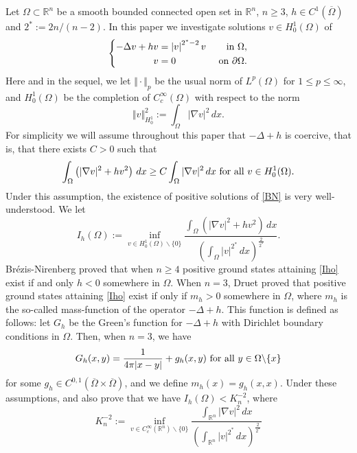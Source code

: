 \documentclass[10pt]{amsart}
\numberwithin{equation}{section}
\newcommand{\Om}{\Omega}
\def \rr {\mathbb{R}}
\def \bb{\hbox}
\def \vv {\mathbb{\Vert}}
\theoremstyle{plain}
\theoremstyle{remark}
\begin{document}
Let $\Om\subset \rr^n$ be a smooth bounded connected open set in $\rr^n$, $n\geq 3$, $h \in C^1(\overline{\Om})$ and  $2^*:=2n/(n-2)$. In this paper we investigate solutions $v \in H^1_0(\Om)$ of 
		\begin{equation}\label{BN}
			\left\{\begin{aligned}
						-\Delta v+h v& =\left|v\right|^{2^*-2}v &\hbox{ in } \Omega, \\
			v& = 0  &\hbox{ on } \partial \Omega.
		\end{aligned}\right.
	\end{equation}
	Here and in the sequel, we let $\vv \cdot \vv_p$ be the usual norm of $L^p(\Om)$ for $1\leq p\leq \infty$, and $H_0^1(\Om)$ be the completion of $C_c^{\infty}(\Om)$ with respect to the norm
	 $$\vv v \vv_{H_0^1}^2:=\int_{\Om}|\nabla v|^2\, dx.$$
For simplicity we will assume throughout this paper that $- \Delta + h$ is coercive, that is, that there exists $C>0$ such that 
		 \begin{equation*}
		 	\int_{\Om} \left(|\nabla v|^2+h v^2 \right) \, dx \geq C \int_{\Om} |\nabla v|^2\, dx \bb{ for all } v\in H_0^1(\Om).
		 \end{equation*}
Under this assumption, the existence of positive solutions of \eqref{BN} is very well-understood. We let 
	\begin{equation}\label{Iho}
		I_{h}(\Om):=	\inf_{v\in H_0^1(\Om) \backslash \{0 \} }\frac{\int_\Om \left( |\nabla v|^2+h v^2\right)\, dx}{\left( \int_\Om |v|^{2^*}\, dx\right) ^{\frac{2}{2^*}}}.
	\end{equation}
Br\'ezis-Nirenberg \cite{BN} proved that when $n \ge 4$ positive ground states attaining \eqref{Iho} exist if and only $h<0$ somewhere in $\Om$. When $n=3$, Druet  \cite{Druetdim3} proved that positive ground states attaining \eqref{Iho} exist if only if $m_h >0$ somewhere in $\Om$, where $m_h$ is the so-called mass-function of the operator $-\Delta +h$. This function is defined as follows: let $G_h$ be the Green's function for $-\Delta +h$ with Dirichlet boundary conditions in $\Om$. Then, when $n=3$, we have
	\begin{equation*}
		G_{h}(x,y)=\frac{1}{4 \pi |x-y|}+g_{h}(x,y) \bb{ for all } y\in \Om\backslash \{x\}
	\end{equation*}
for some $g_h \in C^{0,1}(\overline{\Om}\times \overline{\Om})$, and we define $m_h(x) = g_{h}(x,x)$.
Under these assumptions, \cite{BN} and \cite{Druetdim3} also prove that we have $I_{h}(\Om) < K_n^{-2}$, where 
	\begin{equation}\label{defkn}
		K_n^{-2}:=\inf_{v\in C_c^{\infty}(\rr^n)\backslash\{0\}} \frac{\int_{\rr^n}|\nabla v|^2\, dx}{\left( \int_{\rr^n}| v|^{2^*}\, dx\right)^{\frac{2}{2^*}}} 
	\end{equation}
\end{document}

